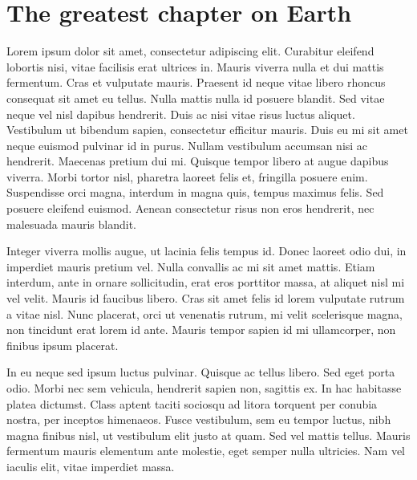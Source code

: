 

\renewcommand{\chapterauthor}{Nan Tucket}
\renewcommand{\shortchaptertitle}{The greatest chapter on Earth}
\chapter{The greatest chapter on Earth}
\label{ch:chapter1}

\cftaddtitleline{toc}{section}{\emph{\chapterauthor}}{}

 Lorem ipsum dolor sit amet, consectetur adipiscing elit. Curabitur eleifend
 lobortis nisi, vitae facilisis erat ultrices in. Mauris viverra nulla et dui
 mattis fermentum. Cras et vulputate mauris. Praesent id neque vitae libero
 rhoncus consequat sit amet eu tellus. Nulla mattis nulla id posuere
 blandit. Sed vitae neque vel nisl dapibus hendrerit. Duis ac nisi vitae risus
 luctus aliquet. Vestibulum ut bibendum sapien, consectetur efficitur
 mauris. Duis eu mi sit amet neque euismod pulvinar id in purus. Nullam
 vestibulum accumsan nisi ac hendrerit. Maecenas pretium dui mi. Quisque tempor
 libero at augue dapibus viverra. Morbi tortor nisl, pharetra laoreet felis et,
 fringilla posuere enim. Suspendisse orci magna, interdum in magna quis, tempus
 maximus felis. Sed posuere eleifend euismod. Aenean consectetur risus non eros
 hendrerit, nec malesuada mauris blandit.

Integer viverra mollis augue, ut lacinia felis tempus id. Donec laoreet odio
dui, in imperdiet mauris pretium vel. Nulla convallis ac mi sit amet
mattis. Etiam interdum, ante in ornare sollicitudin, erat eros porttitor massa,
at aliquet nisl mi vel velit. Mauris id faucibus libero. Cras sit amet felis id
lorem vulputate rutrum a vitae nisl. Nunc placerat, orci ut venenatis rutrum, mi
velit scelerisque magna, non tincidunt erat lorem id ante. Mauris tempor sapien
id mi ullamcorper, non finibus ipsum placerat.

In eu neque sed ipsum luctus pulvinar. Quisque ac tellus libero. Sed eget porta
odio. Morbi nec sem vehicula, hendrerit sapien non, sagittis ex. In hac
habitasse platea dictumst. Class aptent taciti sociosqu ad litora torquent per
conubia nostra, per inceptos himenaeos. Fusce vestibulum, sem eu tempor luctus,
nibh magna finibus nisl, ut vestibulum elit justo at quam. Sed vel mattis
tellus. Mauris fermentum mauris elementum ante molestie, eget semper nulla
ultricies. Nam vel iaculis elit, vitae imperdiet massa.

